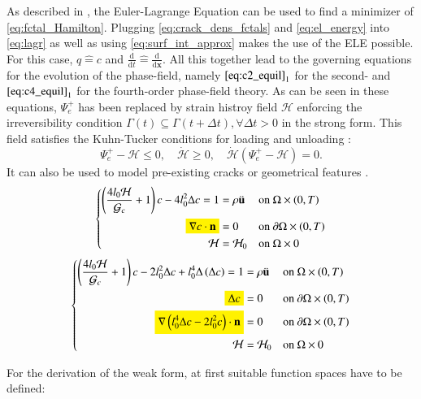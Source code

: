 As described in , the Euler-Lagrange Equation can be used to find a minimizer of \eqref{eq:fctal_Hamilton}. Plugging \eqref{eq:crack_dens_fctals} and \eqref{eq:el_energy} into \eqref{eq:lagr} as well as using \eqref{eq:surf_int_approx} makes the use of the ELE possible. For this case, $q\hat{=}c$ and $\frac{\mathrm{d}}{\mathrm{d}t}\hat{=}\frac{\mathrm{d}}{\mathrm{d}\mathbf{x}}$. All this together lead to the governing equations for the evolution of the phase-field, namely $\eqref{eq:c2_equil}_{1}$ for the second- and $\eqref{eq:c4_equil}_{1}$ for the fourth-order phase-field theory. As can be seen in these equations, $\Psi_{e}^{+}$ has been replaced by strain histroy field $\mathcal{H}$ enforcing the irreversibility condition $\Gamma\left(t\right)\subseteq\Gamma\left(t+\Delta t\right), \forall \Delta t>0$ in the strong form. This field satisfies the Kuhn-Tucker conditions for loading and unloading \cite{01_PF_dyn_brittle}:
\begin{equation} \label{eq:KuhnTucker}
	\Psi_{e}^{+}-\mathcal{H}\leq0, \quad \dot{\mathcal{H}}\geq0, \quad \dot{\mathcal{H}}\left(\Psi_{e}^{+}-\mathcal{H}\right)=0.
\end{equation}
It can also be used to model pre-existing cracks or geometrical features \cite{01_PF_dyn_brittle}.
 \hl{}
\begin{equation} \label{eq:c2_equil}
		 \left\{\begin{alignedat}{2}
\left(\frac{4l_{0}\mathcal{H}}{\mathcal{G}_{c}}+1\right)c - 4l_{0}^{2}\Delta c=1 &= \rho\ddot{\mathbf{u}} && \quad\text{on } \Omega\times\left(0,T\right) \\
\hl{\nabla c\cdot\mathbf{n}} &= 0 && \quad \text{on } \partial\Omega\times\left(0,T\right) \\
\mathcal{H} &= \mathcal{H}_{0} && \quad \text{on } \Omega\times0  
\end{alignedat}\right.
\end{equation}
\begin{equation} \label{eq:c4_equil}
		 \left\{\begin{alignedat}{2}
\left(\frac{4l_{0}\mathcal{H}}{\mathcal{G}_{c}}+1\right)c - 2l_{0}^{2}\Delta c + l_{0}^{4}\Delta\left(\Delta c\right)=1 &= \rho\ddot{\mathbf{u}} && \quad\text{on } \Omega\times\left(0,T\right) \\
\hl{\Delta c} &= 0 && \quad \text{on } \partial\Omega\times\left(0,T\right) \\
\hl{\nabla\left(l_{0}^{4}\Delta c-2l_{0}^{2}c\right)\cdot\mathbf{n}} &= 0 && \quad \text{on } \partial\Omega\times\left(0,T\right) \\
\mathcal{H} &= \mathcal{H}_{0} && \quad \text{on } \Omega\times0  
\end{alignedat}\right.
\end{equation}

For the derivation of the weak form, at first suitable function spaces have to be defined:
\begin{align} \label{eq:fct_spaces}

\end{align}




